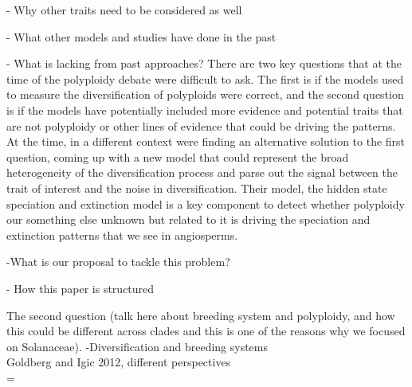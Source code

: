- Why other traits need to be considered as well\newline


- What other models and studies have done in the past\newline

- What is lacking from past approaches? \newline
There are two key questions that at the time of the polyploidy debate were difficult to ask. The first is if the models used to measure the diversification of polyploids were correct, and the second question is if the models have potentially included more evidence and potential traits that are not polyploidy or other lines of evidence that could be driving the patterns. At the time, in a different context \citet{beaulieu_2016} were finding an alternative solution to the first question, coming up with a new model that could represent the broad heterogeneity of the diversification process and parse out the signal between the trait of interest and the noise in diversification. Their model, the hidden state speciation and extinction model is a key component to detect whether polyploidy our something else unknown but related to it is driving the speciation and extinction patterns that we see in angiosperms. \newline

-What is our proposal to tackle this problem?\newline

- How this paper is structured \newline

The second question (talk here about breeding system and polyploidy, and how this could be different across clades and this is one of the reasons why we focused on Solanaceae).
-Diversification and breeding systems\\
Goldberg and Igic 2012, different  perspectives\\



=